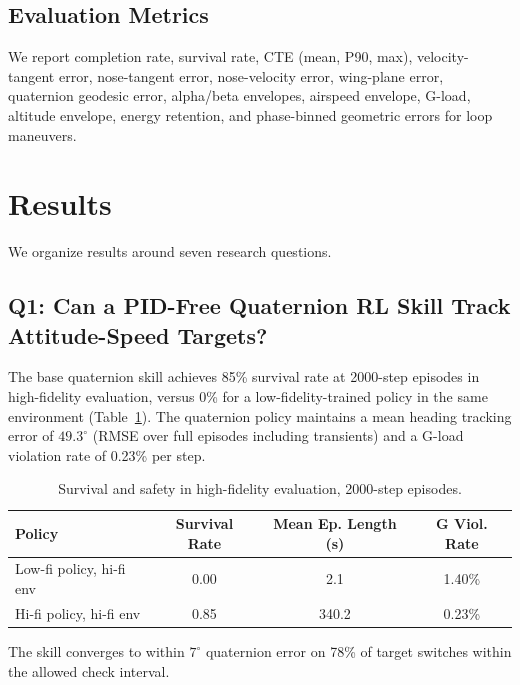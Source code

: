 \documentclass{article}
\begin{document}
\subsection{Evaluation Metrics}

We report completion rate, survival rate, CTE (mean, P90, max), velocity-tangent error, nose-tangent error, nose-velocity error, wing-plane error, quaternion geodesic error, alpha/beta envelopes, airspeed envelope, G-load, altitude envelope, energy retention, and phase-binned geometric errors for loop maneuvers.


\section{Results}

We organize results around seven research questions.

\subsection{Q1: Can a PID-Free Quaternion RL Skill Track Attitude-Speed Targets?}

The base quaternion skill achieves 85\% survival rate at 2000-step episodes in high-fidelity evaluation, versus 0\% for a low-fidelity-trained policy in the same environment (Table~\ref{tab:survival}).
The quaternion policy maintains a mean heading tracking error of $49.3^\circ$ (RMSE over full episodes including transients) and a G-load violation rate of 0.23\% per step.

\begin{table}[t]
\caption{Survival and safety in high-fidelity evaluation, 2000-step episodes.}
\label{tab:survival}
\centering
\begin{tabular}{lccc}
  \hline
  \textbf{Policy} & \textbf{Survival Rate} & \textbf{Mean Ep. Length (s)} & \textbf{G Viol. Rate} \\
  \hline
  Low-fi policy, hi-fi env  & 0.00  & 2.1   & 1.40\% \\
  Hi-fi policy, hi-fi env   & 0.85  & 340.2 & 0.23\% \\
  \hline
\end{tabular}
\end{table}

The skill converges to within $7^\circ$ quaternion error on 78\% of target switches within the allowed check interval.
\end{document}

